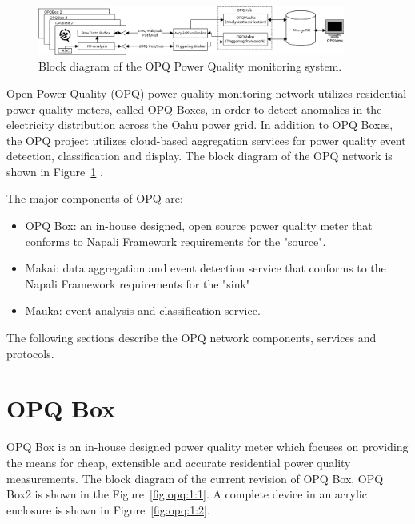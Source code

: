 \begin{figure}[h]
  \begin{center}
  \includegraphics[width=0.9\textwidth]{img/system-diagram.png}
  \end{center}
  \caption{Block diagram of the OPQ Power Quality monitoring system.}
  \label{fig:opq:1}
\end{figure}

Open Power Quality (OPQ) power quality monitoring network utilizes residential power quality meters, called OPQ Boxes, in order to detect anomalies in the electricity distribution across the Oahu power grid.
In addition to OPQ Boxes, the OPQ project utilizes cloud-based aggregation services for power quality event detection, classification and display.
The block diagram of the OPQ network is shown in Figure~\ref{fig:opq:1} .

The major components of OPQ are:
\begin {itemize}
	\item OPQ Box: an in-house designed, open source power quality meter that conforms to Napali Framework requirements for the "source".
	\item Makai: data aggregation and event detection service that conforms to the Napali Framework requirements for the "sink"
	\item Mauka: event analysis and classification service.
\end {itemize}

The following sections describe the OPQ network components, services and protocols.

\section{OPQ Box}\label{sec:opq-box}

OPQ Box is an in-house designed power quality meter which focuses on providing the means for cheap, extensible and accurate residential power quality measurements.
The block diagram of the current revision of OPQ Box, OPQ Box2 is shown in the Figure~\ref{fig:opq:1:1}.
A complete device in an acrylic enclosure is shown in Figure~\ref{fig:opq:1:2}.

